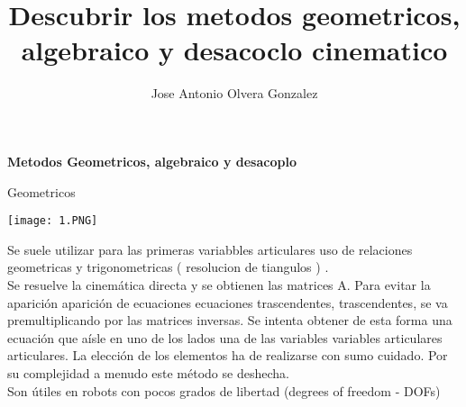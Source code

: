 \documentclass[12pt,letterpaper]{report}
\author{Jose Antonio Olvera Gonzalez }
\title{Descubrir los metodos geometricos, algebraico y desacoclo cinematico }
\begin{document}
\begin{center}
\textbf{Metodos Geometricos, algebraico y desacoplo}
\begin{flushleft}
Geometricos 
\begin{flushleft}
\texttt{[image: 1.PNG]} 
\begin{flushleft}
Se suele utilizar para las primeras variabbles articulares uso de relaciones geometricas y trigonometricas ( resolucion de tiangulos ) .\\
Se resuelve la cinemática directa y se obtienen las matrices A. Para evitar la aparición aparición de ecuaciones ecuaciones trascendentes, trascendentes, se va
premultiplicando por las matrices inversas. Se intenta obtener de esta forma una ecuación que aísle en uno
de los lados una de las variables variables articulares articulares. La elección de los elementos ha de realizarse con sumo cuidado. Por su complejidad a menudo este método se deshecha.\\
Son útiles en robots con pocos grados de libertad (degrees of
freedom - DOFs)


\end{flushleft}
\end{flushleft}
\end{flushleft}
\end{center}
\end{document}

